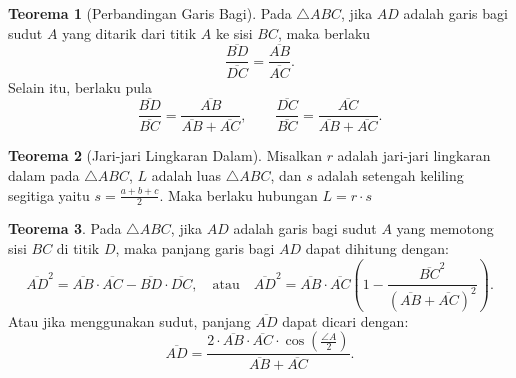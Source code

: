 ﻿\documentclass[aspectratio=169]{beamer}
\theoremstyle{definition}
\newtheorem{teorema}{Teorema}
\begin{document}
\begin{frame}{\insertsection}{\insertsubsection}
  \begin{teorema}[Perbandingan Garis Bagi\label{thm:perbandingan_garis_bagi}]
    Pada $\triangle ABC$, jika $AD$ adalah garis bagi sudut $A$ yang ditarik dari titik $A$ ke sisi $BC$, maka berlaku
    \[
      \frac{\overline{BD}}{\overline{DC}}=\frac{\overline{AB}}{\overline{AC}}.
    \]
    Selain itu, berlaku pula
    \[
      \frac{\overline{BD}}{\overline{BC}}=\frac{\overline{AB}}{\overline{AB}+\overline{AC}},
      \qquad
      \frac{\overline{DC}}{\overline{BC}}=\frac{\overline{AC}}{\overline{AB}+\overline{AC}}.
    \]
  \end{teorema}
  \begin{teorema}[Jari-jari Lingkaran Dalam\label{thm:jari_jari_lingkaran_dalam}]
    Misalkan $r$ adalah jari-jari lingkaran dalam pada $\triangle ABC$, $L$ adalah luas $\triangle ABC$, dan $s$ adalah setengah keliling segitiga yaitu $s = \frac{a+b+c}{2}$. Maka berlaku hubungan
    $ L = r\cdot s $
  \end{teorema}
\end{frame}

\begin{frame}{\insertsection}{\insertsubsection}
  \begin{teorema}
    Pada $\triangle ABC$, jika $AD$ adalah garis bagi sudut $A$ yang memotong sisi $BC$ di titik $D$, maka panjang garis bagi $AD$ dapat dihitung dengan:
    \[
      \overline{AD}^2 = \overline{AB} \cdot \overline{AC} - \overline{BD} \cdot \overline{DC}, \quad \text{atau} \quad \overline{AD}^2 = \overline{AB} \cdot \overline{AC} \left(1 - \frac{\overline{BC}^2}{(\overline{AB} + \overline{AC})^2}\right).
    \]
    Atau jika menggunakan sudut, panjang $\overline{AD}$ dapat dicari dengan:
    \[
      \overline{AD}=\frac{2\cdot \overline{AB}\cdot \overline{AC}\cdot \cos\left(\frac{\angle A}{2}\right)}{\overline{AB}+\overline{AC}}.
    \]
  \end{teorema}
\end{frame}
\end{document}
